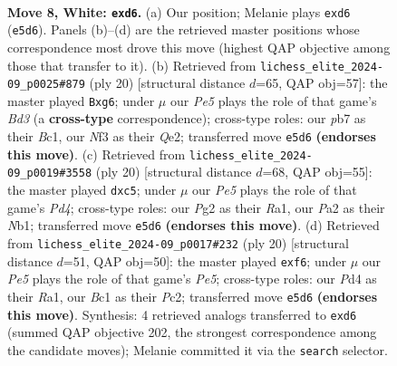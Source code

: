 \documentclass[11pt]{article}
\begin{document}
\begin{figure}[p]\centering
\begin{subfigure}{0.46\textwidth}\centering
\resizebox{\linewidth}{!}{%
\newchessgame
\chessboard[
  setfen={rnbqk2r/ppp2pbp/1n1pp1p1/4P3/3P4/1B3N2/PPP2PPP/RNBQ1RK1 w kq - 0 8},
  showmover=false,
  pgfstyle=straightmove, color=movearrow, markmove={e5-d6}
]}
\caption{}
\end{subfigure}\hfill
\begin{subfigure}{0.46\textwidth}\centering
\resizebox{\linewidth}{!}{%
\newchessgame
\chessboard[
  setfen={r1bqk2r/ppb2ppp/2n1p1n1/3pP3/8/N1PB1N2/PP2QPPP/R1B2RK1 w kq - 3 11},
  showmover=false,
  pgfstyle=straightmove, color=movearrow, markmove={d3-g6}
]}
\caption{}
\end{subfigure}
\\[4pt]
\begin{subfigure}{0.46\textwidth}\centering
\resizebox{\linewidth}{!}{%
\newchessgame
\chessboard[
  setfen={rn1q1rk1/pb2bppp/1p2p3/2pn4/3P4/PP1BPN2/5PPP/RNBQ1RK1 w - - 0 11},
  showmover=false,
  pgfstyle=straightmove, color=movearrow, markmove={d4-c5}
]}
\caption{}
\end{subfigure}\hfill
\begin{subfigure}{0.46\textwidth}\centering
\resizebox{\linewidth}{!}{%
\newchessgame
\chessboard[
  setfen={rnbqr1k1/1p2p1bp/2p2ppn/3pP3/p7/P2P1NP1/1PP1QPBP/RNB1R1K1 w - - 0 11},
  showmover=false,
  pgfstyle=straightmove, color=movearrow, markmove={e5-f6}
]}
\caption{}
\end{subfigure}
\caption{\textbf{Move 8, White: \texttt{exd6}.} (a) Our position; Melanie plays \texttt{exd6} (\texttt{e5d6}). Panels (b)--(d) are the retrieved master positions whose correspondence most drove this move (highest QAP objective among those that transfer to it). (b) Retrieved from \texttt{lichess\_elite\_2024-09\_p0025\#879} (ply 20) [structural distance $d$=65, QAP obj=57]: the master played \texttt{Bxg6}; under $\mu$ our \emph{Pe5} plays the role of that game's \emph{Bd3} (a \textbf{cross-type} correspondence); cross-type roles: our \emph{p}b7 as their \emph{B}c1, our \emph{N}f3 as their \emph{Q}e2; transferred move \texttt{e5d6} \textbf{(endorses this move)}. (c) Retrieved from \texttt{lichess\_elite\_2024-09\_p0019\#3558} (ply 20) [structural distance $d$=68, QAP obj=55]: the master played \texttt{dxc5}; under $\mu$ our \emph{Pe5} plays the role of that game's \emph{Pd4}; cross-type roles: our \emph{P}g2 as their \emph{R}a1, our \emph{P}a2 as their \emph{N}b1; transferred move \texttt{e5d6} \textbf{(endorses this move)}. (d) Retrieved from \texttt{lichess\_elite\_2024-09\_p0017\#232} (ply 20) [structural distance $d$=51, QAP obj=50]: the master played \texttt{exf6}; under $\mu$ our \emph{Pe5} plays the role of that game's \emph{Pe5}; cross-type roles: our \emph{P}d4 as their \emph{R}a1, our \emph{B}c1 as their \emph{P}c2; transferred move \texttt{e5d6} \textbf{(endorses this move)}. Synthesis: 4 retrieved analogs transferred to \texttt{exd6} (summed QAP objective 202, the strongest correspondence among the candidate moves); Melanie committed it via the \texttt{search} selector.}
\label{fig:thought-m14}
\end{figure}
\end{document}
